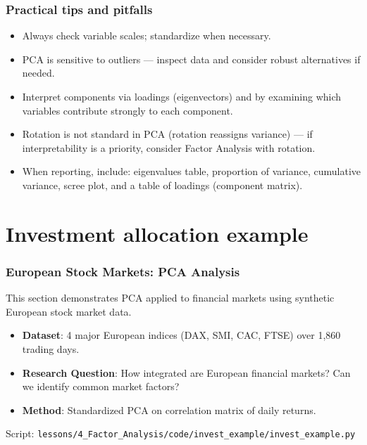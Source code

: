 \documentclass[aspectratio=169]{beamer}
\begin{document}
\begin{frame}
    \frametitle{Practical tips and pitfalls}
    \begin{itemize}
        \item Always check variable scales; standardize when necessary. \pause
        \item PCA is sensitive to outliers — inspect data and consider robust alternatives if needed. \pause
        \item Interpret components via loadings (eigenvectors) and by examining which variables contribute strongly to each component. \pause
        \item Rotation is not standard in PCA (rotation reassigns variance) — if interpretability is a priority, consider Factor Analysis with rotation. \pause
        \item When reporting, include: eigenvalues table, proportion of variance, cumulative variance, scree plot, and a table of loadings (component matrix). \pause
    \end{itemize}
\end{frame}

\section{Investment allocation example}

\begin{frame}
    \frametitle{European Stock Markets: PCA Analysis}
    This section demonstrates PCA applied to financial markets using synthetic European stock market data.
    \begin{itemize}
        \item \textbf{Dataset}: 4 major European indices (DAX, SMI, CAC, FTSE) over 1,860 trading days. \pause
        \item \textbf{Research Question}: How integrated are European financial markets? Can we identify common market factors? \pause
        \item \textbf{Method}: Standardized PCA on correlation matrix of daily returns. \pause
    \end{itemize}
    \vspace{6pt}
    Script: \texttt{lessons/4\_Factor\_Analysis/code/invest\_example/invest\_example.py}
\end{frame}
\end{document}
